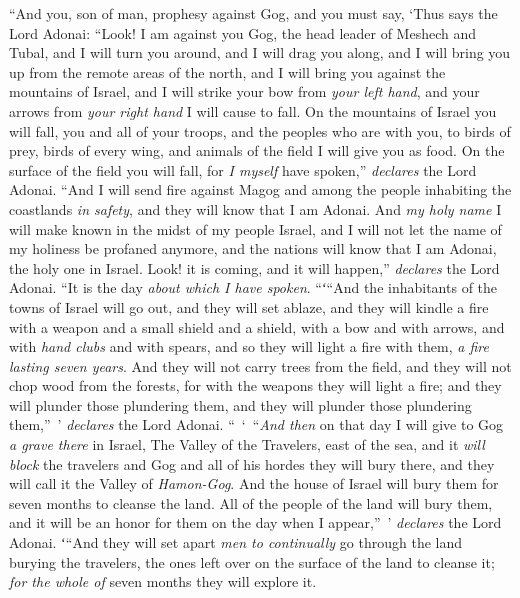 \begin{biblechapter} %
 “And you, son of man, prophesy against Gog, and you must say, ‘Thus says the Lord Adonai: “Look! I am against you Gog, the head leader of Meshech and Tubal,
\verse and I will turn you around, and I will drag you along, and I will bring you up from the remote areas of the north, and I will bring you against the mountains of Israel,
\verse and I will strike your bow from \textit{your left hand}, and your arrows from \textit{your right hand} I will cause to fall.
\verse On the mountains of Israel you will fall, you and all of your troops, and the peoples who are with you, to birds of prey, birds of every wing, and animals of the field I will give you as food.
\verse On the surface of the field you will fall, for \textit{I myself} have spoken,” \textit{declares} the Lord Adonai.
\verse “And I will send fire against Magog and among the people inhabiting the coastlands \textit{in safety}, and they will know that I am Adonai.
\verse And \textit{my holy name} I will make known in the midst of my people Israel, and I will not let the name of my holiness be profaned anymore, and the nations will know that I am Adonai, the holy one in Israel.
\verse Look! it is coming, and it will happen,” \textit{declares} the Lord Adonai. “It is the day \textit{about which I have spoken}.
\verse “ʻ“And the inhabitants of the towns of Israel will go out, and they will set ablaze, and they will kindle a fire with a weapon and a small shield and a shield, with a bow and with arrows, and with \textit{hand clubs} and with spears, and so they will light a fire with them, \textit{a fire lasting seven years}.
\verse And they will not carry trees from the field, and they will not chop wood from the forests, for with the weapons they will light a fire; and they will plunder those plundering them, and they will plunder those plundering them,” ’ \textit{declares} the Lord Adonai.
\verse “ ‘ “\textit{And then} on that day I will give to Gog \textit{a grave there} in Israel, The Valley of the Travelers, east of the sea, and it \textit{will block} the travelers and Gog and all of his hordes they will bury there, and they will call it the Valley of \textit{Hamon-Gog}.
\verse And the house of Israel will bury them for seven months to cleanse the land.
\verse All of the people of the land will bury them, and it will be an honor for them on the day when I appear,” ’ \textit{declares} the Lord Adonai.
\verse ʻ“And they will set apart \textit{men to continually} go through the land burying the travelers, the ones left over on the surface of the land to cleanse it; \textit{for the whole of} seven months they will explore it.

\end{biblechapter}
